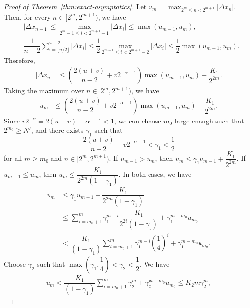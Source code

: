 \begin{proof}[Proof of Theorem~\ref{thm:exact-asymptotics}]
          Let $u_m = \max_{2^m \le n < 2^{m+1}} |\Delta x_n|$. Then, for every $n\in [2^m, 2^{m+1})$, we have
          \begin{align*}
             & |\Delta x_{n-1}| \le \max_{2^m-1\le i < 2^{m+1}-1}|\Delta x_i| \le \max(u_{m-1},u_m),                                                                             \\
             & \dfrac{1}{n-2}\sum_{i=\lfloor n/2\rfloor}^{n-2}|\Delta x_{i}| \le \dfrac{1}{2}\max_{2^{m-1}\le i < 2^{m+1}-2} |\Delta x_i|\le  \dfrac{1}{2} \max(u_{m-1}, u_{m}).
          \end{align*}
          Therefore,
          \begin{align*}
            |\Delta x_{n}|
             & \le \left(\dfrac{2(u+v)}{n-2}+v2^{-\alpha-1}\right)\max(u_{m-1},u_m) + \dfrac{K_1}{2^{2m}}.
          \end{align*}
          Taking the maximum over $n\in [2^m, 2^{m+1})$, we have
          \begin{align*}
            u_m
             & \le \left(\dfrac{2(u+v)}{n-2}+v2^{-\alpha-1}\right)\max(u_{m-1},u_m) + \dfrac{K_1}{2^{2m}}.
          \end{align*}
          Since $v2^{-\alpha} = 2(u+v)-\alpha-1 < 1$, we can choose $m_0$ large enough such that $2^{m_0} \ge N'$, and there exists $\gamma_1$ such that
          $$\dfrac{2(u+v)}{n-2}+ v2^{-\alpha-1} < \gamma_1 < \dfrac{1}{2}$$
          for all $m\ge m_0$ and $n\in [2^m, 2^{m+1})$. If $u_{m-1} > u_m$, then $u_m \le \gamma_1 u_{m-1} + \dfrac{K_1}{2^{2m}}$. If $u_{m-1} \le u_m$, then $u_m \le \dfrac{K_1}{2^{2m}(1-\gamma_1)}$. In both cases, we have
          \begin{align*}
            u_m
             & \le \gamma_1 u_{m-1} + \dfrac{K_1}{2^{2m}(1-\gamma_1)}                                                             \\
             & \le \sum_{i=m_0+1}^m \gamma_1^{m-i}\dfrac{K_1}{2^{2i}(1-\gamma_1)} + \gamma_1^{m-m_0}u_{m_0}                       \\
             & < \dfrac{K_1}{(1-\gamma_1)}\sum_{i=m_0+1}^m \gamma_1^{m-i}\left(\dfrac{1}{4}\right)^{i} + \gamma_1^{m-m_0}u_{m_0}.
          \end{align*}
          Choose $\gamma_2$ such that $\max\left(\gamma_1, \dfrac{1}{4}\right) < \gamma_2 < \dfrac{1}{2}$. We have
          \begin{align*}
            u_m < \dfrac{K_1}{(1-\gamma_1)}\sum_{i=m_0+1}^m \gamma_2^m + \gamma_2^{m-m_0}u_{m_0} \le K_2 m\gamma_2^m,

\end{align*}
\end{proof}
